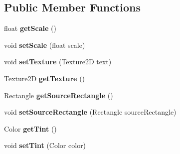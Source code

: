 \subsection*{Public Member Functions}
\begin{DoxyCompactItemize}
\item 
\hypertarget{interface_tile_engine_1_1_interfaces_1_1_drawable_a76cc277f0eb55cbb1a5c107a8320f47b}{float {\bfseries get\-Scale} ()}\label{df/d03/interface_tile_engine_1_1_interfaces_1_1_drawable_a76cc277f0eb55cbb1a5c107a8320f47b}

\item 
\hypertarget{interface_tile_engine_1_1_interfaces_1_1_drawable_a26df4c915e4a9d1c6787ffa0c7ad5596}{void {\bfseries set\-Scale} (float scale)}\label{df/d03/interface_tile_engine_1_1_interfaces_1_1_drawable_a26df4c915e4a9d1c6787ffa0c7ad5596}

\item 
\hypertarget{interface_tile_engine_1_1_interfaces_1_1_drawable_afb39e791cb98a0f41ed87887887ad31c}{void {\bfseries set\-Texture} (Texture2\-D text)}\label{df/d03/interface_tile_engine_1_1_interfaces_1_1_drawable_afb39e791cb98a0f41ed87887887ad31c}

\item 
\hypertarget{interface_tile_engine_1_1_interfaces_1_1_drawable_ab20d9642c88ae050c0f19b87dbc72c3a}{Texture2\-D {\bfseries get\-Texture} ()}\label{df/d03/interface_tile_engine_1_1_interfaces_1_1_drawable_ab20d9642c88ae050c0f19b87dbc72c3a}

\item 
\hypertarget{interface_tile_engine_1_1_interfaces_1_1_drawable_a9ed91958fd7a38f429ab89e8bdd484da}{Rectangle {\bfseries get\-Source\-Rectangle} ()}\label{df/d03/interface_tile_engine_1_1_interfaces_1_1_drawable_a9ed91958fd7a38f429ab89e8bdd484da}

\item 
\hypertarget{interface_tile_engine_1_1_interfaces_1_1_drawable_a606231997f3ae0bd62a67208ef06660b}{void {\bfseries set\-Source\-Rectangle} (Rectangle source\-Rectangle)}\label{df/d03/interface_tile_engine_1_1_interfaces_1_1_drawable_a606231997f3ae0bd62a67208ef06660b}

\item 
\hypertarget{interface_tile_engine_1_1_interfaces_1_1_drawable_aa9e7c7ad62d6e48d98d626238f1b3c80}{Color {\bfseries get\-Tint} ()}\label{df/d03/interface_tile_engine_1_1_interfaces_1_1_drawable_aa9e7c7ad62d6e48d98d626238f1b3c80}

\item 
\hypertarget{interface_tile_engine_1_1_interfaces_1_1_drawable_a262ec54bc4e01df1f853d6de50787630}{void {\bfseries set\-Tint} (Color color)}\label{df/d03/interface_tile_engine_1_1_interfaces_1_1_drawable_a262ec54bc4e01df1f853d6de50787630}


\end{DoxyCompactItemize}

